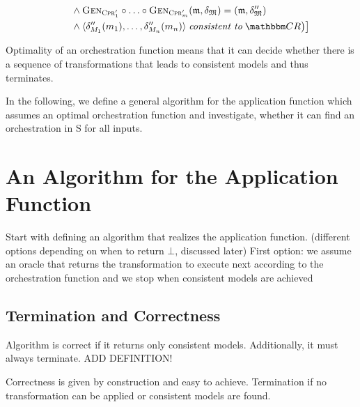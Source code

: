 \begin{definition}
\begin{align*}
            & \formulaskip \formulaskip
            \land \generalizationfunction{\consistencypreservationrule{1}'} \concatfunction \dots \concatfunction \generalizationfunction{\consistencypreservationrule{m}'}(\modeltuple{m}, \changetuple{\metamodeltuple{M}}) = (\modeltuple{m}, \changetuple{\metamodeltuple{M}}'')\\
            & \formulaskip \formulaskip
            \land \tupled{\change{\metamodel{M}{1}}''(\model{m}{1}), \dots, \change{\metamodel{M}{n}}''(\model{m}{n})} \consistenttomath \consistencyrelationset{CR}
        \bigr) \bigr]
    \end{align*}
\end{definition}


Optimality of an orchestration function means that it can decide whether there is a sequence of transformations that leads to consistent models and thus terminates.

In the following, we define a general algorithm for the application function which assumes an optimal orchestration function and investigate, whether it can find an orchestration in S for all inputs.




\section{An Algorithm for the Application Function}

Start with defining an algorithm that realizes the application function. (different options depending on when to return $\bot$, discussed later)
First option: we assume an oracle that returns the transformation to execute next according to the orchestration function and we stop when consistent models are achieved


\subsection{Termination and Correctness}
Algorithm is correct if it returns only consistent models. Additionally, it must always terminate.
ADD DEFINITION!

Correctness is given by construction and easy to achieve.
Termination if no transformation can be applied or consistent models are found.

